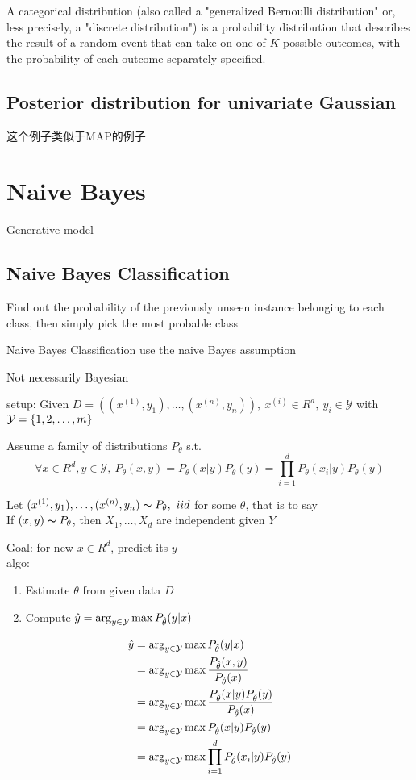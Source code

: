 \documentclass{article}
\begin{document}
A categorical distribution (also called a "generalized Bernoulli distribution" or, less precisely, a "discrete distribution") 
is a probability distribution that describes the result of a random event that can take on one of $K$ possible outcomes, 
with the probability of each outcome separately specified.

\subsection{Posterior distribution for univariate Gaussian}
这个例子类似于MAP的例子

\section{Naive Bayes}
Generative model
\subsection{Naive Bayes Classification}
Find out the probability of the previously unseen instance belonging to each class, then simply pick the most probable class

Naive Bayes Classification use the naive Bayes assumption

Not necessarily Bayesian

setup: Given $D = ((x^{(1)}, y_1), \ldots, (x^{(n)}, y_n)),\ x^{(i)} \in R^d,\ y_i \in \mathcal{Y}$ with $\mathcal{Y} = \{1,2,\ldots, m\}$

Assume a family of distributions $P_\theta$ s.t.
$$\forall x \in R^d, y \in \mathcal{Y},\ P_\theta(x,y) = P_\theta(x|y) P_\theta(y) = \prod_{i=1}^d P_\theta(x_i|y) P_\theta(y)$$

Let $(x^{(1)}, y_1), \ldots, (x^{(n)}, y_n) \thicksim{P}_\theta,\ iid$ for some $\theta$, that is to say\\
If $(x,y) \thicksim{P}_\theta$, then $X_1, \ldots, X_d$ are independent given $Y$

Goal: for new $x \in R^d$, predict its $y$\\
algo: 
\begin{enumerate}
\item Estimate $\theta$ from given data $D$
\item Compute $\hat{y} = \arg_{y \in \mathcal{Y}} \max P_{\hat{\theta}}(y|x)$
\end{enumerate}

$$
\begin{aligned}
\hat{y} 
& = \arg_{y \in \mathcal{Y}} \max P_{\hat{\theta}}(y|x) \\
& = \arg_{y \in \mathcal{Y}} \max \dfrac{P_{\hat{\theta}} (x,y)}{ P_{\hat{\theta}}(x) } \\
& = \arg_{y \in \mathcal{Y}} \max \dfrac{P_{\hat{\theta}} (x|y) P_{\hat{\theta}}(y)}{ P_{\hat{\theta}}(x) } \\
& = \arg_{y \in \mathcal{Y}} \max P_{\hat{\theta}} (x|y) P_{\hat{\theta}}(y) \\
& = \arg_{y \in \mathcal{Y}} \max \prod_{i=1}^d P_{\hat{\theta}} (x_i|y) P_{\hat{\theta}}(y) \\
\end{aligned}
$$
\end{document}
